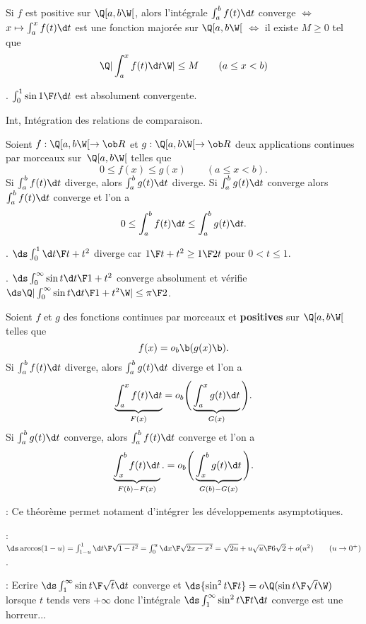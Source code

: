 \Propriete [$a\in\ob R$, $b>a$ dans $\ol{\ob R}$, {$f:\Q]a,b\W]\to\ob R$} continue par morceaux] 
Si $f$ est positive sur $\Q[a,b\W[$, alors l'int\'egrale $\int_a^bf(t)\d t$ converge $\Longleftrightarrow$ $x\mapsto\int_a^xf(t)\d t$ est une fonction major\'ee sur $\Q[a,b\W[$ $\Longleftrightarrow$ il existe $M\ge0$ tel que 
$$
\Q|\int_a^xf(t)\d t\W|\le M\qquad(a\le x<b)
$$ 


\Exemple. $\int_0^1\sin{1\F t}\d t$ est absolument convergente. 
\medskip

\Subsection Int, Int\'egration des relations de comparaison. 

\Propriete [$a\in\ob R$, $b>a$ un \'el\'ement de $\ol R$] 
Soient $f:\Q[a,b\W[\to\ob R$ et $g:\Q[a,b\W[\to\ob R$ deux applications continues par morceaux sur~$\Q[a,b\W[$ telles que 
$$
0\le f(x)\le g(x)\qquad (a\le x<b). 
$$
Si $\int_a^bf(t)\d t$ diverge, alors $\int_a^bg(t)\d t$ diverge. \medskip\noindent
Si $\int_a^bg(t)\d t$ converge alors $\int_a^bf(t)\d t$ converge et l'on a 
$$
0\le \int_a^bf(t)\d t\le \int_a^bg(t)\d t. 
$$ 

\Exemple. $\ds\int_0^1{\d t\F t+t^2}$ diverge car ${1\F t+t^2}\ge{1\F 2t}$ pour $0<t\le 1$. 

\Exemple. $\ds\int_0^\infty{\sin t\d t\F1+t^2}$ converge absolument et v\'erifie 
$\ds\Q|\int_0^\infty{\sin t\d t\F1+t^2}\W|\le {\pi\F2}$. 
\medskip

\Theoreme [$a\in\ob R$ et $b>a$ \'el\'ement de $\ol R$]
Soient $f$ et $g$ des fonctions continues par morceaux et {\bf positives} sur $\Q[a,b\W[$ telles que 
$$
f(x)=o_b\b(g(x)\b).
$$ 
Si $\int_a^b f(t)\d t$ diverge, alors $\int_a^bg(t)\d t$ diverge et l'on a 
$$
\underbrace{\int_a^x f(t)\d t}_{F(x)}=o_b\Bigg(\underbrace{\int_a^xg(t)\d t}_{G(x)}\Bigg). 
$$
Si $\int_a^b g(t)\d t$ converge, alors $\int_a^bf(t)\d t$ converge et l'on a 
$$
\underbrace{\int_x^b f(t)\d t}_{F(b)-F(x)}.=o_b\Bigg(\underbrace{\int_x^bg(t)\d t}_{G(b)-G(x)}\Bigg). 
$$

\Remarque : Ce th\'eor\`eme permet notament d'int\'egrer les d\'eveloppements asymptotiques. 
\bigskip

\Application : $\ds \arccos(1-u)=\int_{1-u}^1{\d t\F\sqrt{1-t^2}}
=\int_0^u{\d x\F\sqrt{2x-x^2}}=\sqrt{2u}+{u\sqrt u\F6\sqrt2}+o(u^2)\qquad(u\to0^+)$. 

%
\bigskip

\Remarque : Ecrire $\ds \int_1^\infty{\sin t\F \sqrt t}\d t$ converge 
et $\ds{\sin^2 t\F t}=o\Q({\sin t\F\sqrt t}\W)$ lorsque $t$ tends vers $+\infty$ 
donc l'int\'egrale $\ds \int_1^\infty{\sin^2 t\F t}\d t$ converge est une horreur...
\bigskip



